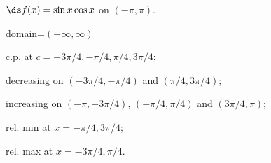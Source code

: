 {$\ds f(x) =\sin x\cos x$ on $(-\pi,\pi)$.
}
{domain=$(-\infty,\infty)$

c.p. at $c=-3\pi/4,-\pi/4,\pi/4,3\pi/4$; 

decreasing on $(-3\pi/4,-\pi/4)$ and $(\pi/4,3\pi/4)$;

increasing on $(-\pi,-3\pi/4)$, $(-\pi/4,\pi/4)$ and $(3\pi/4,\pi)$;

rel. min at $x=-\pi/4,3\pi/4$;

rel. max at $x=-3\pi/4,\pi/4$.
}
